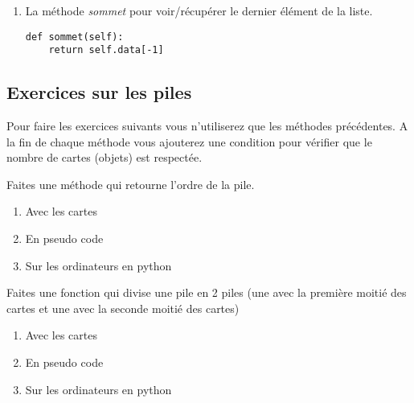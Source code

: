 \documentclass[12pt,fleqn]{article} %
\begin{document}
\begin{enumerate}
\begin{center}
	\begin{varwidth}[t]{.5\textwidth}
		\begin{lstlisting}[language=iPython,linewidth = 15cm]
def depiler(self):
	return self.data.pop()\end{lstlisting}
\end{varwidth}\end{center} 
\item La méthode \textit{sommet} pour voir/récupérer le dernier élément de la liste.
\begin{center}
	\begin{varwidth}[t]{.5\textwidth}
		\begin{lstlisting}[language=iPython,linewidth = 15cm]
def sommet(self):
	return self.data[-1]\end{lstlisting}
\end{varwidth}\end{center} 

\end{enumerate}

\subsection{Exercices sur les piles}

Pour faire les exercices suivants vous n'utiliserez que les méthodes précédentes. A la fin de chaque méthode vous ajouterez une condition pour vérifier que le nombre de cartes (objets) est respectée.

\begin{exercise}
Faites une méthode qui retourne l'ordre de la pile.
\begin{enumerate}
	\item Avec les cartes
	\item En pseudo code
	\item Sur les ordinateurs en python
\end{enumerate}
\end{exercise}

\begin{exercise}
Faites une fonction qui divise une pile en 2 piles (une avec la première moitié des cartes et une avec la seconde moitié des cartes)
\begin{enumerate}
	\item Avec les cartes
	\item En pseudo code
	\item Sur les ordinateurs en python
\end{enumerate}
\end{exercise}
\end{document}
